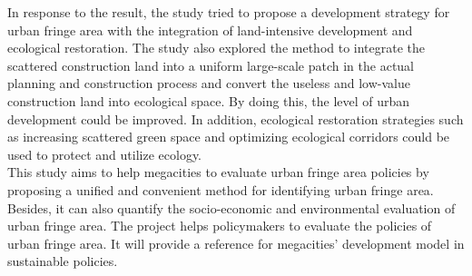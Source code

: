 In response to the result, the study tried to propose a development strategy for urban fringe area with the integration of land-intensive development and ecological restoration. The study also explored the method to integrate the scattered construction land into a uniform large-scale patch in the actual planning and construction process and convert the useless and low-value construction land into ecological space. By doing this, the level of urban development could be improved. In addition, ecological restoration strategies such as increasing scattered green space and optimizing ecological corridors could be used to protect and utilize ecology. \\

This study aims to help megacities to evaluate urban fringe area policies by proposing a unified and convenient method for identifying urban fringe area. Besides, it can also quantify the socio-economic and environmental evaluation of urban fringe area. The project helps policymakers to evaluate the policies of urban fringe area. It will provide a reference for megacities' development model in sustainable policies.\\
